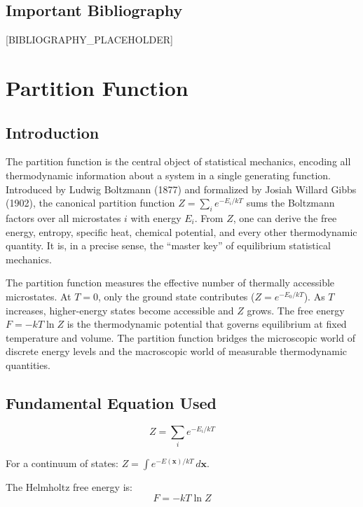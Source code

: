 \documentclass[11pt,openright]{book}
\begin{document}
\section*{Important Bibliography}

[BIBLIOGRAPHY_PLACEHOLDER]


\chapter{Partition Function}

\section*{Introduction}

The partition function is the central object of statistical mechanics, encoding all thermodynamic information about a system in a single generating function. Introduced by Ludwig Boltzmann (1877) and formalized by Josiah Willard Gibbs (1902), the canonical partition function $Z = \sum_{i} e^{-E_{i}/kT}$ sums the Boltzmann factors over all microstates $i$ with energy $E_{i}$. From $Z$, one can derive the free energy, entropy, specific heat, chemical potential, and every other thermodynamic quantity. It is, in a precise sense, the ``master key'' of equilibrium statistical mechanics.

The partition function measures the effective number of thermally accessible microstates. At $T = 0$, only the ground state contributes ($Z = e^{-E_{0}/kT}$). As $T$ increases, higher-energy states become accessible and $Z$ grows. The free energy $F = -kT\ln Z$ is the thermodynamic potential that governs equilibrium at fixed temperature and volume. The partition function bridges the microscopic world of discrete energy levels and the macroscopic world of measurable thermodynamic quantities.
\section*{Fundamental Equation Used}

\begin{equation}
\boxed{\; Z = \sum_{i} e^{-E_{i}/kT}\;}
\label{eq:partition-function}
\end{equation}

For a continuum of states: $Z = \int e^{-E(\mathbf{x})/kT}\,d\mathbf{x}$.

The Helmholtz free energy is:
\begin{equation}
F = -kT\ln Z
\label{eq:free-energy}
\end{equation}
\end{document}

